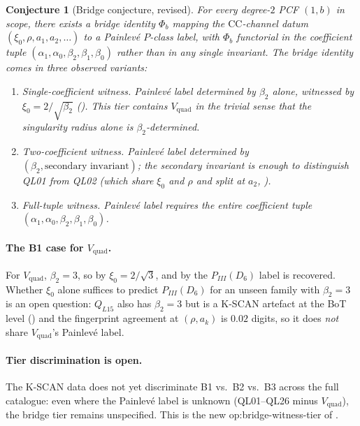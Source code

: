 \documentclass[11pt,reqno]{amsart}
\theoremstyle{plain}
\newtheorem{conjecture}[theorem]{Conjecture}
\theoremstyle{definition}
\theoremstyle{remark}
\newcommand{\CC}{\mathrm{CC}}
\newcommand{\Vquad}{V_{\mathrm{quad}}}
\begin{document}
\begin{conjecture}[Bridge conjecture, revised]
\label{conj:bridge}
For every degree-$2$ PCF $(1, b)$ in scope, there exists a
\emph{bridge identity} $\Phi_b$ mapping the $\CC$-channel
datum $(\xi_0, \rho, a_1, a_2, \ldots)$ to a Painlev\'e
$P$-class label, with $\Phi_b$ functorial in the coefficient
tuple $(\alpha_1, \alpha_0, \beta_2, \beta_1, \beta_0)$
rather than in any single invariant.
The bridge identity comes in three observed variants:
\begin{enumerate}[label=B\arabic*.]
\item \emph{Single-coefficient witness.} Painlev\'e label
determined by $\beta_2$ alone, witnessed by
$\xi_0 = 2/\sqrt{\beta_2}$ (). This tier
contains $\Vquad$ in the trivial sense that the
\emph{singularity radius} alone is $\beta_2$-determined.
\item \emph{Two-coefficient witness.} Painlev\'e label
determined by $(\beta_2, \text{secondary invariant})$;
the secondary invariant is enough to distinguish QL01 from
QL02 (which share $\xi_0$ and $\rho$ and split at $a_2$,
).
\item \emph{Full-tuple witness.} Painlev\'e label requires
the entire coefficient tuple
$(\alpha_1, \alpha_0, \beta_2, \beta_1, \beta_0)$.
\end{enumerate}
\end{conjecture}

\paragraph{The B1 case for $\Vquad$.} For $\Vquad$,
$\beta_2 = 3$, so by  $\xi_0 = 2/\sqrt 3$,
and by  the $P_{III}(D_6)$ label is
recovered. Whether $\xi_0$ alone suffices to predict
$P_{III}(D_6)$ for an unseen family with $\beta_2 = 3$ is
an open question: $Q_{L15}$ also has $\beta_2 = 3$ but is a
K-SCAN artefact at the BoT level () and the
fingerprint agreement at $(\rho, a_k)$ is $0.02$ digits, so
it does \emph{not} share $\Vquad$'s Painlev\'e label.

\paragraph{Tier discrimination is open.} The K-SCAN data does
not yet discriminate B1 vs.\ B2 vs.\ B3 across the full
catalogue: even where the Painlev\'e label is unknown
(QL01--QL26 minus $\Vquad$), the bridge tier remains
unspecified. This is the new
\textsf{op:bridge-witness-tier} of .
\end{document}

